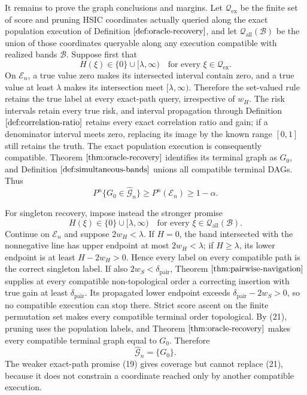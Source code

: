 It remains to prove the graph conclusions and margins. Let \(\mathcal Q_{\mathrm{ex}}\) be the finite set of score and pruning HSIC coordinates actually queried along the exact population execution of Definition \(\ref{def:oracle-recovery}\), and let \(\mathcal Q_{\mathrm{all}}(\mathcal B)\) be the union of those coordinates queryable along any execution compatible with realized bands \(\mathcal B\). Suppose first that
\[
 H(\xi)\in\{0\}\cup[\lambda,\infty)
 \quad\text{for every }\xi\in\mathcal Q_{\mathrm{ex}}. \tag{19}
\]
On \(\mathcal E_n\), a true value zero makes its intersected interval contain zero, and a true value at least \(\lambda\) makes its intersection meet \([\lambda,\infty)\). Therefore the set-valued rule retains the true label at every exact-path query, irrespective of \(w_H\). The risk intervals retain every true risk, and interval propagation through Definition \(\ref{def:correlation-ratio}\) retains every exact correlation ratio and gain; if a denominator interval meets zero, replacing its image by the known range \([0,1]\) still retains the truth. The exact population execution is consequently compatible. Theorem \(\ref{thm:oracle-recovery}\) identifies its terminal graph as \(G_0\), and Definition \(\ref{def:simultaneous-bands}\) unions all compatible terminal DAGs. Thus
\[
 P^n\{G_0\in\widehat{\mathcal G}_n\}\ge P^n(\mathcal E_n)\ge1-\alpha. \tag{20}
\]

For singleton recovery, impose instead the stronger promise
\[
 H(\xi)\in\{0\}\cup[\lambda,\infty)
 \quad\text{for every }\xi\in\mathcal Q_{\mathrm{all}}(\mathcal B). \tag{21}
\]
Continue on \(\mathcal E_n\) and suppose \(2w_H<\lambda\). If \(H=0\), the band intersected with the nonnegative line has upper endpoint at most \(2w_H<\lambda\); if \(H\ge\lambda\), its lower endpoint is at least \(H-2w_H>0\). Hence every label on every compatible path is the correct singleton label. If also \(2w_S<\delta_{\mathrm{pair}}\), Theorem \(\ref{thm:pairwise-navigation}\) supplies at every compatible non-topological order a correcting insertion with true gain at least \(\delta_{\mathrm{pair}}\). Its propagated lower endpoint exceeds \(\delta_{\mathrm{pair}}-2w_S>0\), so no compatible execution can stop there. Strict score ascent on the finite permutation set makes every compatible terminal order topological. By (21), pruning uses the population labels, and Theorem \(\ref{thm:oracle-recovery}\) makes every compatible terminal graph equal to \(G_0\). Therefore
\[
 \widehat{\mathcal G}_n=\{G_0\}. \tag{22}
\]
The weaker exact-path promise (19) gives coverage but cannot replace (21), because it does not constrain a coordinate reached only by another compatible execution.

